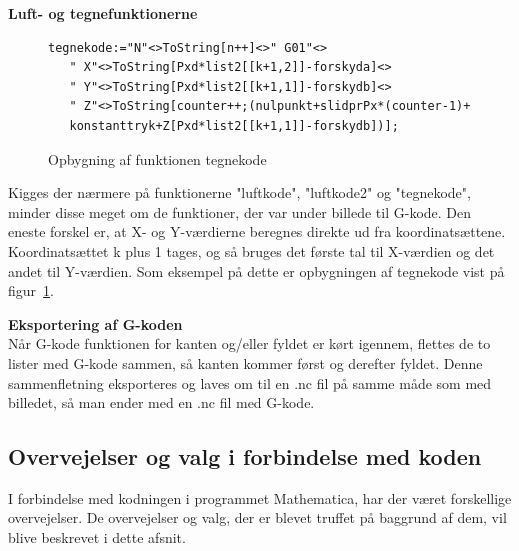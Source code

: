 \textbf{Luft- og tegnefunktionerne}\\
\begin{figure}[h]
	\begin{lstlisting}
tegnekode:="N"<>ToString[n++]<>" G01"<>
   " X"<>ToString[Pxd*list2[[k+1,2]]-forskyda]<>
   " Y"<>ToString[Pxd*list2[[k+1,1]]-forskydb]<>
   " Z"<>ToString[counter++;(nulpunkt+slidprPx*(counter-1)+
   konstanttryk+Z[Pxd*list2[[k+1,1]]-forskydb])];
 \end{lstlisting}
	\caption{Opbygning af funktionen tegnekode}
	\label{fig:tegnekode}
	\end{figure}
Kigges der nærmere på funktionerne "luftkode", "luftkode2" og "tegnekode", minder disse meget om de funktioner, der var under billede til G-kode. Den eneste forskel er, at X- og Y-værdierne beregnes direkte ud fra koordinatsættene. Koordinatsættet k plus 1 tages, og så bruges det første tal til X-værdien og det andet til Y-værdien. Som eksempel på dette er opbygningen af tegnekode vist på figur~\ref{fig:tegnekode}.

\textbf{Eksportering af G-koden}\\
Når G-kode funktionen for kanten og/eller fyldet er kørt igennem, flettes de to lister med G-kode sammen, så kanten kommer først og derefter fyldet. Denne sammenfletning eksporteres og laves om til en .nc fil på samme måde som med billedet, så man ender med en .nc fil med G-kode.
\subsection{Overvejelser og valg i forbindelse med koden}
I forbindelse med kodningen i programmet Mathematica, har der været forskellige overvejelser. De overvejelser og valg, der er blevet truffet på baggrund af dem, vil blive beskrevet i dette afsnit.


